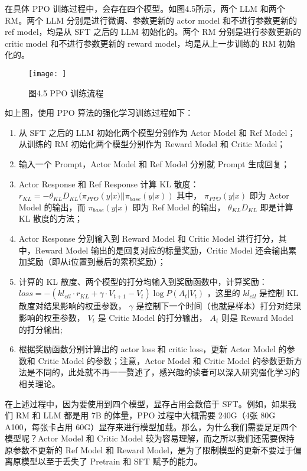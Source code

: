 \documentclass[12pt,a4paper]{book}
\begin{document}
在具体 PPO 训练过程中，会存在四个模型。如图4.5所示，两个 LLM 和两个
RM。两个 LLM 分别是进行微调、参数更新的 actor model 和不进行参数更新的
ref model，均是从 SFT 之后的 LLM 初始化的。两个 RM 分别是进行参数更新的
critic model 和不进行参数更新的 reward model，均是从上一步训练的 RM
初始化的。

\begin{figure}[htbp]\centering
\texttt{[image: ]}
\caption{图4.5 PPO 训练流程}
\end{figure}

如上图，使用 PPO 算法的强化学习训练过程如下：

\begin{enumerate}
\def\labelenumi{\arabic{enumi}.}
\tightlist
\item
  从 SFT 之后的 LLM 初始化两个模型分别作为 Actor Model 和 Ref
  Model；从训练的 RM 初始化两个模型分别作为 Reward Model 和 Critic
  Model；
\item
  输入一个 Prompt，Actor Model 和 Ref Model 分别就 Prompt 生成回复；
\item
  Actor Response 和 Ref Response 计算 KL 散度：
  \(r_{KL} = -\theta_{KL}D_{KL}(\pi_{PPO}(y|x)||\pi_{base}(y|x))\)
  其中， \(\pi_{PPO}(y|x)\) 即为 Actor Model 的输出，而
  \(\pi_{base}(y|x)\) 即为 Ref Model 的输出， \(\theta_{KL}D_{KL}\)
  即是计算 KL 散度的方法；
\item
  Actor Response 分别输入到 Reward Model 和 Critic Model
  进行打分，其中，Reward Model 输出的是回复对应的标量奖励，Critic Model
  还会输出累加奖励（即从i位置到最后的累积奖励）；
\item
  计算的 KL 散度、两个模型的打分均输入到奖励函数中，计算奖励：
  \(loss = -(kl_{ctl} \cdot r_{KL} + \gamma \cdot V_{t+1} - V_{t}) \log P(A_t|V_t)\)
  ，这里的 \(kl_{ctl}\) 是控制 KL 散度对结果影响的权重参数， \(\gamma\)
  是控制下一个时间（也就是样本）打分对结果影响的权重参数， \(V_t\) 是
  Critic Model 的打分输出， \(A_t\) 则是 Reward Model 的打分输出;
\item
  根据奖励函数分别计算出的 actor loss 和 critic loss，更新 Actor Model
  的参数和 Critic Model 的参数；注意，Actor Model 和 Critic Model
  的参数更新方法是不同的，此处就不再一一赘述了，感兴趣的读者可以深入研究强化学习的相关理论。
\end{enumerate}

在上述过程中，因为要使用到四个模型，显存占用会数倍于 SFT。例如，如果我们
RM 和 LLM 都是用 7B 的体量，PPO 过程中大概需要 240G（4张 80G
A100，每张卡占用
60G）显存来进行模型加载。那么，为什么我们需要足足四个模型呢？Actor Model
和 Critic Model 较为容易理解，而之所以我们还需要保持原参数不更新的 Ref
Model 和 Reward
Model，是为了限制模型的更新不要过于偏离原模型以至于丢失了 Pretrain 和
SFT 赋予的能力。
\end{document}
